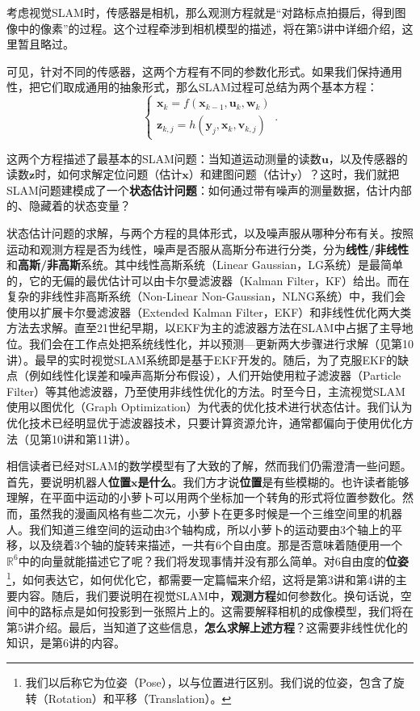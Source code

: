 考虑视觉SLAM时，传感器是相机，那么观测方程就是“对路标点拍摄后，得到图像中的像素”的过程。这个过程牵涉到相机模型的描述，将在第5讲中详细介绍，这里暂且略过。

可见，针对不同的传感器，这两个方程有不同的参数化形式。如果我们保持通用性，把它们取成通用的抽象形式，那么SLAM过程可总结为两个基本方程：
\begin{equation}
\label{eq:slamproblem}
\left\{ \begin{array}{l}
{\bm{x}_k} = f\left( {{\bm{x}_{k - 1}},{\bm{u}_k}}, \bm{w}_k \right)\\
{\bm{z}_{k,j}} = h\left( {{ \bm{y}_j},{ \bm{x}_k}}, \bm{v}_{k,j} \right)
\end{array} \right. .
\end{equation}

这两个方程描述了最基本的SLAM问题：当知道运动测量的读数$\bm{u}$，以及传感器的读数$\bm{z}$时，如何求解定位问题（估计$\bm{x}$）和建图问题（估计$\bm{y}$）？这时，我们就把SLAM问题建模成了一个\textbf{状态估计问题}：如何通过带有噪声的测量数据，估计内部的、隐藏着的状态变量？

状态估计问题的求解，与两个方程的具体形式，以及噪声服从哪种分布有关。按照运动和观测方程是否为线性，噪声是否服从高斯分布进行分类，分为\textbf{线性/非线性}和\textbf{高斯/非高斯}系统。其中线性高斯系统（Linear Gaussian，LG系统）是最简单的，它的无偏的最优估计可以由卡尔曼滤波器（Kalman Filter，KF）给出。而在复杂的非线性非高斯系统（Non-Linear Non-Gaussian，NLNG系统）中，我们会使用以扩展卡尔曼滤波器（Extended Kalman Filter，EKF）和非线性优化两大类方法去求解。直至21世纪早期，以EKF为主的滤波器方法在SLAM中占据了主导地位。我们会在工作点处把系统线性化，并以预测—更新两大步骤进行求解（见第10讲）。最早的实时视觉SLAM系统即是基于EKF\textsuperscript{\cite{Davison2007}}开发的。随后，为了克服EKF的缺点（例如线性化误差和噪声高斯分布假设），人们开始使用粒子滤波器（Particle Filter）等其他滤波器，乃至使用非线性优化的方法。时至今日，主流视觉SLAM使用以图优化（Graph Optimization）为代表的优化技术进行状态估计\textsuperscript{\cite{Strasdat2012}}。我们认为优化技术已经明显优于滤波器技术，只要计算资源允许，通常都偏向于使用优化方法（见第10讲和第11讲）。

\clearpage
相信读者已经对SLAM的数学模型有了大致的了解，然而我们仍需澄清一些问题。首先，要说明机器人\textbf{位置$\bm{x}$是什么}。我们方才说\textbf{位置}是有些模糊的。也许读者能够理解，在平面中运动的小萝卜可以用两个坐标加一个转角的形式将位置参数化。然而，虽然我的漫画风格有些二次元，小萝卜在更多时候是一个三维空间里的机器人。我们知道三维空间的运动由3个轴构成，所以小萝卜的运动要由3个轴上的平移，以及绕着3个轴的旋转来描述，一共有6个自由度。那是否意味着随便用一个$\mathbb{R}^6$中的向量就能描述它了呢？我们将发现事情并没有那么简单。对6自由度的\textbf{位姿}\footnote{我们以后称它为位姿（Pose），以与位置进行区别。我们说的位姿，包含了旋转（Rotation）和平移（Translation）。}，如何表达它，如何优化它，都需要一定篇幅来介绍，这将是第3讲和第4讲的主要内容。随后，我们要说明在视觉SLAM中，\textbf{观测方程}如何参数化。换句话说，空间中的路标点是如何投影到一张照片上的。这需要解释相机的成像模型，我们将在第5讲介绍。最后，当知道了这些信息，\textbf{怎么求解上述方程}？这需要非线性优化的知识，是第6讲的内容。

